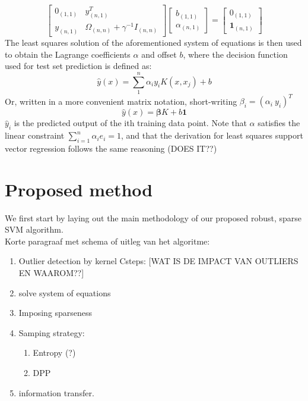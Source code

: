 \documentclass[preprint,12pt]{elsarticle}
\begin{document}
\begin{equation}
	\begin{bmatrix}
		0_{(1,1)} & y_{(n,1)}^T \\
		y_{(n,1)} & \Omega_{(n,n)} + \gamma^{-1} I_{(n,n)} 
		\end{bmatrix}	
		\begin{bmatrix}
		b_{(1,1)} \\
		\alpha_{(n,1)}
		\end{bmatrix}
		=
		\begin{bmatrix}
		0_{(1,1)} \\
		\mathbf{1}_{(n,1)}
	\end{bmatrix}	
\end{equation}
The least squares solution of the aforementioned system of equations is then used to  obtain the Lagrange coefficients $\alpha$ and offset $b$, where the decision function used for test set prediction is defined as:
\begin{equation}
	\hat{y}(x) = \sum_{1}^{n} \alpha_i y_i K(x, x_j) + b	
	\label{eq:classification}
\end{equation}
Or, written in a more convenient matrix notation, short-writing $\beta_i= (\alpha_i \  y_i)^T$
\begin{equation}
	\hat{y}(x) = \mathbf{\beta} K + b \mathbf{1}
	\label{eq:prediction}
\end{equation}
$\hat{y}_i$ is the predicted output of the ith training data point. Note that $\alpha$ satisfies the linear constraint $\sum_{i=1}^{n} \alpha_i  e_i = 1$, and that the derivation for least squares support vector regression follows the same reasoning (DOES IT??) %

\newpage

\section{Proposed method}
We first start by laying out the main methodology of our proposed robust, sparse SVM algorithm. \\
Korte paragraaf met schema of uitleg van het algoritme:
\begin{enumerate}
	\item Outlier detection by kernel Csteps: [WAT IS DE IMPACT VAN OUTLIERS EN WAAROM??]
	\item solve system of equations
	\item Imposing sparseness
	\item Samping strategy: 
	\begin{enumerate}
		\item Entropy (?)
		\item DPP
	\end{enumerate}
	\item information transfer.
\end{enumerate} 
\end{document}

